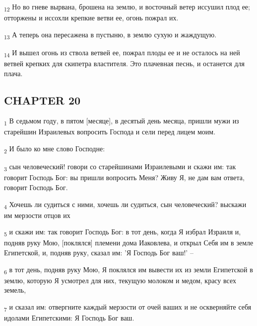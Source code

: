 \begin{tcolorbox}
\textsubscript{12} Но во гневе вырвана, брошена на землю, и восточный ветер иссушил плод ее; отторжены и иссохли крепкие ветви ее, огонь пожрал их.
\end{tcolorbox}
\begin{tcolorbox}
\textsubscript{13} А теперь она пересажена в пустыню, в землю сухую и жаждущую.
\end{tcolorbox}
\begin{tcolorbox}
\textsubscript{14} И вышел огонь из ствола ветвей ее, пожрал плоды ее и не осталось на ней ветвей крепких для скипетра властителя. Это плачевная песнь, и останется для плача.
\end{tcolorbox}
\subsection{CHAPTER 20}
\begin{tcolorbox}
\textsubscript{1} В седьмом году, в пятом [месяце], в десятый день месяца, пришли мужи из старейшин Израилевых вопросить Господа и сели перед лицем моим.
\end{tcolorbox}
\begin{tcolorbox}
\textsubscript{2} И было ко мне слово Господне:
\end{tcolorbox}
\begin{tcolorbox}
\textsubscript{3} сын человеческий! говори со старейшинами Израилевыми и скажи им: так говорит Господь Бог: вы пришли вопросить Меня? Живу Я, не дам вам ответа, говорит Господь Бог.
\end{tcolorbox}
\begin{tcolorbox}
\textsubscript{4} Хочешь ли судиться с ними, хочешь ли судиться, сын человеческий? выскажи им мерзости отцов их
\end{tcolorbox}
\begin{tcolorbox}
\textsubscript{5} и скажи им: так говорит Господь Бог: в тот день, когда Я избрал Израиля и, подняв руку Мою, [поклялся] племени дома Иаковлева, и открыл Себя им в земле Египетской, и, подняв руку, сказал им: 'Я Господь Бог ваш!' --
\end{tcolorbox}
\begin{tcolorbox}
\textsubscript{6} в тот день, подняв руку Мою, Я поклялся им вывести их из земли Египетской в землю, которую Я усмотрел для них, текущую молоком и медом, красу всех земель,
\end{tcolorbox}
\begin{tcolorbox}
\textsubscript{7} и сказал им: отвергните каждый мерзости от очей ваших и не оскверняйте себя идолами Египетскими: Я Господь Бог ваш.
\end{tcolorbox}
